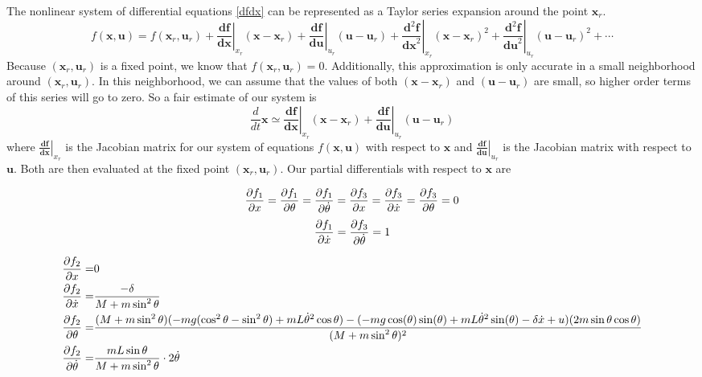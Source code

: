 \documentclass[]{article}
\newcommand{\bx}{\boldsymbol{x}}
\newcommand{\bu}{\boldsymbol{u}}
\begin{document}
The nonlinear system of differential equations \eqref{dfdx} can be represented as a Taylor series expansion around the point $\bx_r$.
\begin{equation}
	 f(\bx, \bu) = f(\bx_r, \bu_r) + \left.  \frac{\boldsymbol{df}}{\boldsymbol{dx}} \right|_{x_r}(\bx -\bx_r) 
	 + \left.  \frac{\boldsymbol{df}}{\boldsymbol{du}} \right|_{u_r}(\bu -\bu_r) 
	 + \left. \frac{\boldsymbol{d}^2\boldsymbol{f}}{\boldsymbol{dx}^2} \right|_{x_r}(\bx -\bx_r)^2
	 + \left. \frac{\boldsymbol{d}^2\boldsymbol{f}}{\boldsymbol{du}^2} \right|_{u_r}(\bu -\bu_r)^2 + \cdots
\end{equation}
Because $(\bx_r, \bu_r)$ is a fixed point, we know that $f(\bx_r, \bu_r) = 0$. Additionally, this approximation is only accurate in a small neighborhood around $(\bx_r, \bu_r)$.  In this neighborhood, we can assume that the values of both $(\bx -\bx_r)$ and $(\bu -\bu_r)$ are small, so higher order terms of this series will go to zero. So a fair estimate of our system is
\begin{equation}
	\frac{d}{dt} \bx \simeq \left.  \frac{\boldsymbol{df}}{\boldsymbol{dx}} \right|_{x_r}(\bx -\bx_r) 
	+  \left.  \frac{\boldsymbol{df}}{\boldsymbol{du}} \right|_{u_r}(\bu -\bu_r) 
\end{equation}
where $\left.  \frac{\boldsymbol{df}}{\boldsymbol{dx}} \right|_{x_r}$ is the Jacobian matrix for our system of equations $f(\bx, \bu)$ with respect to $\bx$ and $\left.  \frac{\boldsymbol{df}}{\boldsymbol{du}} \right|_{u_r}$ is the Jacobian matrix with respect to $\bu$. Both are then evaluated at the fixed point $(\bx_r, \bu_r)$.  Our partial differentials with respect to $\bx$ are

\begin{equation*}
	\pdv{f_1}{x}  = \pdv{f_1}{\theta} = \pdv{f_1}{\dot{\theta}} = 	\pdv{f_3}{x}  =	\pdv{f_3}{\dot{x}} = \pdv{f_3}{\theta} = 0 
\end{equation*}
\begin{equation*}
	 \pdv{f_1}{\dot{x}} = \pdv{f_3}{\dot{\theta}}  = 1
\end{equation*}


\begin{eqnarray*}
	\pdv{f_2}{x} = & 0 \\
	\pdv{f_2}{\dot{x}} =&  \frac{-\delta}{M + m \sin^2 \theta} \\
	\pdv{f_2}{\theta} =  & \frac{(M+ m \sin^2 \theta)(-mg(\cos^2 \theta - \sin^2 \theta)+mL\dot{\theta}^2 \cos \theta)-(-mg \cos(\theta)\sin(\theta) + mL{\dot{\theta}}^2 \sin(\theta)-\delta \dot{x}+u)(2m \sin \theta \cos \theta)}{(M + m \sin^2 \theta)^2} \\
	\pdv{f_2}{\dot{\theta}} = & \frac{mL\sin \theta}{M + m \sin^2 \theta} \cdot 2 \dot{\theta}
\end{eqnarray*}
\end{document}
